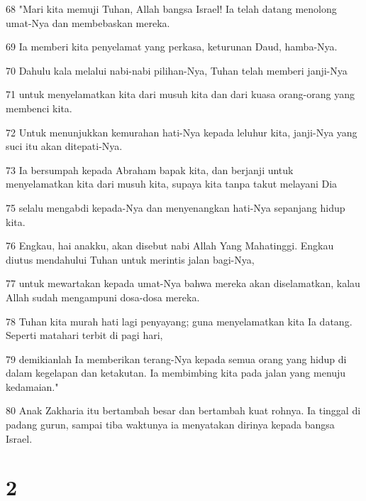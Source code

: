 \par 68 "Mari kita memuji Tuhan, Allah bangsa Israel! Ia telah datang menolong umat-Nya dan membebaskan mereka.
\par 69 Ia memberi kita penyelamat yang perkasa, keturunan Daud, hamba-Nya.
\par 70 Dahulu kala melalui nabi-nabi pilihan-Nya, Tuhan telah memberi janji-Nya
\par 71 untuk menyelamatkan kita dari musuh kita dan dari kuasa orang-orang yang membenci kita.
\par 72 Untuk menunjukkan kemurahan hati-Nya kepada leluhur kita, janji-Nya yang suci itu akan ditepati-Nya.
\par 73 Ia bersumpah kepada Abraham bapak kita, dan berjanji untuk menyelamatkan kita dari musuh kita, supaya kita tanpa takut melayani Dia
\par 75 selalu mengabdi kepada-Nya dan menyenangkan hati-Nya sepanjang hidup kita.
\par 76 Engkau, hai anakku, akan disebut nabi Allah Yang Mahatinggi. Engkau diutus mendahului Tuhan untuk merintis jalan bagi-Nya,
\par 77 untuk mewartakan kepada umat-Nya bahwa mereka akan diselamatkan, kalau Allah sudah mengampuni dosa-dosa mereka.
\par 78 Tuhan kita murah hati lagi penyayang; guna menyelamatkan kita Ia datang. Seperti matahari terbit di pagi hari,
\par 79 demikianlah Ia memberikan terang-Nya kepada semua orang yang hidup di dalam kegelapan dan ketakutan. Ia membimbing kita pada jalan yang menuju kedamaian."
\par 80 Anak Zakharia itu bertambah besar dan bertambah kuat rohnya. Ia tinggal di padang gurun, sampai tiba waktunya ia menyatakan dirinya kepada bangsa Israel.

\chapter{2}

